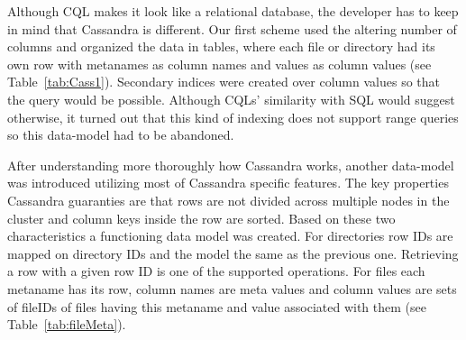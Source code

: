 Although CQL makes it look like a relational database, the developer has to keep in mind that
Cassandra is different. Our first scheme used the altering number of columns and organized the 
data in tables, where each file or directory had its own row with metanames as column
names and values as column values (see Table~\ref{tab:Cass1}).
Secondary indices were created over column values so that 
the query would be possible. Although CQLs' similarity with SQL would suggest otherwise, 
it turned out that this kind of indexing does not support range queries so this data-model
had to be abandoned. 

After understanding more thoroughly how Cassandra works, another data-model was introduced 
utilizing most of Cassandra specific features. The key properties Cassandra guaranties are that 
rows are not divided across multiple nodes in the cluster and column keys inside the row
are sorted. Based on these two characteristics a functioning data model was created. For  
directories row IDs are mapped on directory IDs and the model the same as the previous one. 
Retrieving a row with a given row ID is one of the supported operations.
For files each metaname has its row, column names are meta values and column values are sets of 
fileIDs of files having this metaname and value associated with them (see Table~\ref{tab:fileMeta}). 


